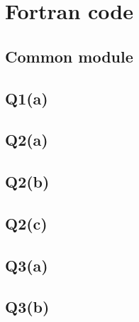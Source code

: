 \documentclass[12pt]{article}
\begin{document}
\appendix
\section{Fortran code}
\subsection*{Common module}
\subsection*{Q1(a)}
\subsection*{Q2(a)}
\subsection*{Q2(b)}
\subsection*{Q2(c)}
\subsection*{Q3(a)}
\subsection*{Q3(b)}
\end{document}

